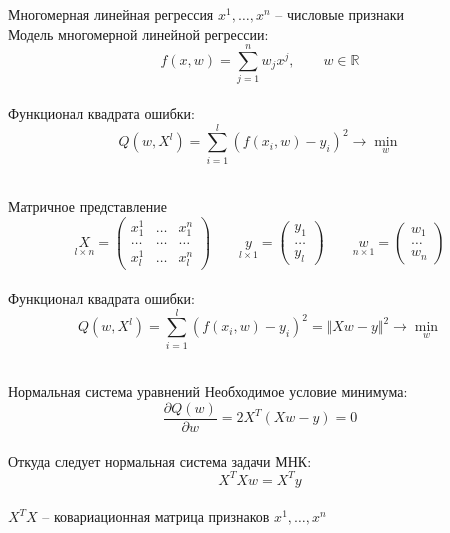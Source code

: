 \documentclass[10pt]{beamer}
\begin{document}
{
\begin{frame}{Многомерная линейная регрессия}
	$x^1, \dots, x^n$ -- числовые признаки\\
	Модель многомерной линейной регрессии:\\
	$$f (x, w) = \sum\limits_{j=1}^n w_j x^j, \qquad w \in \mathbb{R}$$\\
	\bigbreak
	\pause
	Функционал квадрата ошибки:\\
	$$Q(w,X^l) = \sum\limits_{i=1}^l (f (x_i, w) - y_i)^2  \rightarrow \min\limits_{w}$$\\
\end{frame}
}

\begin{frame}{Матричное представление}
	$$\underset{l \times n}{X} = \begin{pmatrix}
	  x_1^1 & \dots & x_1^n \\
	  \dots & \dots & \dots\\
	  x_l^1 & \dots & x_l^n
	 \end{pmatrix} \qquad 
	 \underset{l \times 1}{y} = \begin{pmatrix}
	  y_1 \\
	  \dots\\
	  y_l
	 \end{pmatrix} \qquad
	 \underset{n \times 1}{w} = \begin{pmatrix}
	  w_1 \\
	  \dots\\
	  w_n
	 \end{pmatrix}$$ \\
	\bigbreak
	\pause
	Функционал квадрата ошибки:\\
	$$Q(w,X^l) = \sum\limits_{i=1}^l (f (x_i, w) - y_i)^2  = \Vert Xw - y \Vert^2 \rightarrow \min\limits_{w}$$\\
\end{frame}

\begin{frame}{Нормальная система уравнений}
	Необходимое условие минимума:\\
	$$\frac{\partial Q(w)}{\partial w}  = 2 X^T(X w - y) = 0$$\\
	\pause
	\bigbreak
	Откуда следует нормальная система задачи МНК:\\
	$$X^T X w = X^T y$$\\
	$X^T X$ -- ковариационная матрица признаков $x^1, \dots, x^n$\\
\end{frame}
\end{document}
